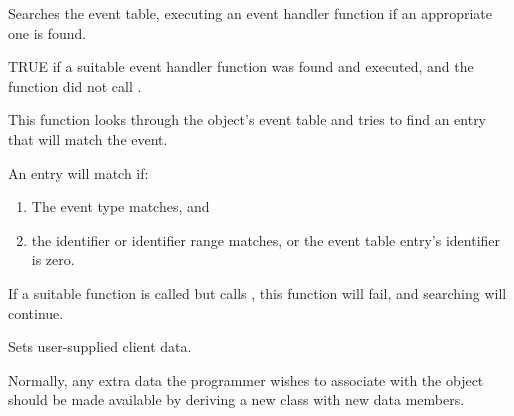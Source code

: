 

\label{wxevthandlersearcheventtable}


Searches the event table, executing an event handler function if an appropriate one
is found.





TRUE if a suitable event handler function was found and executed, and the function did not
call .


This function looks through the object's event table and tries to find an entry
that will match the event.

An entry will match if:

\begin{enumerate}\itemsep=0pt
\item The event type matches, and
\item the identifier or identifier range matches, or the event table entry's identifier is zero.
\end{enumerate}

If a suitable function is called but calls , this function will
fail, and searching will continue.



\label{wxevthandlersetclientdata}


Sets user-supplied client data.




Normally, any extra data the programmer wishes
to associate with the object should be made available by deriving a new class
with new data members.


